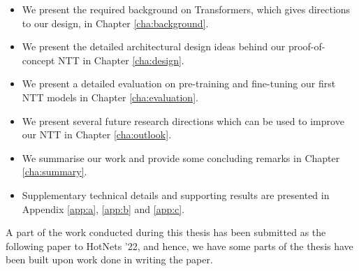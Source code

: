\begin{itemize}
\item We present the required background on Transformers, which gives directions to our design, in Chapter \ref{cha:background}.
\item We present the detailed architectural design ideas behind our proof-of-concept NTT in Chapter \ref{cha:design}.
\item We present a detailed evaluation on pre-training and fine-tuning our first NTT models in Chapter \ref{cha:evaluation}.
\item We present several future research directions which can be used to improve our NTT in Chapter \ref{cha:outlook}.
\item We summarise our work and provide some concluding remarks in Chapter \ref{cha:summary}.
\item Supplementary technical details and supporting results are presented in Appendix \ref{app:a}, \ref{app:b} and \ref{app:c}. 
\end{itemize}

A part of the work conducted during this thesis has been submitted as the following paper\cite{newhope} to HotNets '22, and hence, we have some parts of the thesis have been built upon work done in writing the paper.
